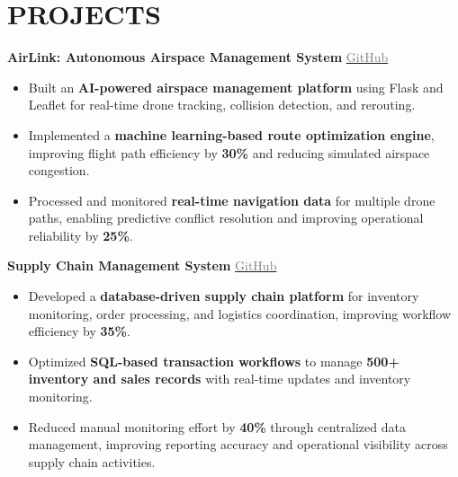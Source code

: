 \documentclass[10pt,a4paper]{article}
\begin{document}
\section*{PROJECTS}

\textbf{AirLink: Autonomous Airspace Management System} \hfill \href{https://github.com/Navya-1008/Airlink}{\textcolor{gray}{GitHub}}  
\begin{itemize}[noitemsep, topsep=0pt, leftmargin=*]
    \item Built an \textbf{AI-powered airspace management platform} using Flask and Leaflet for real-time drone tracking, collision detection, and rerouting.
    
    \item Implemented a \textbf{machine learning-based route optimization engine}, improving flight path efficiency by \textbf{30\%} and reducing simulated airspace congestion.
    
    \item Processed and monitored \textbf{real-time navigation data} for multiple drone paths, enabling predictive conflict resolution and improving operational reliability by \textbf{25\%}.
\end{itemize}

\vspace{0.3em}

\textbf{Supply Chain Management System} \hfill \href{https://github.com/Navya-1008/Supply-Chain-Management}{\textcolor{gray}{GitHub}}  
\begin{itemize}[noitemsep, topsep=0pt, leftmargin=*]
    \item Developed a \textbf{database-driven supply chain platform} for inventory monitoring, order processing, and logistics coordination, improving workflow efficiency by \textbf{35\%}.
    
    \item Optimized \textbf{SQL-based transaction workflows} to manage \textbf{500+ inventory and sales records} with real-time updates and inventory monitoring.
    
    \item Reduced manual monitoring effort by \textbf{40\%} through centralized data management, improving reporting accuracy and operational visibility across supply chain activities.
\end{itemize}

\vspace{0.3em}
\end{document}
